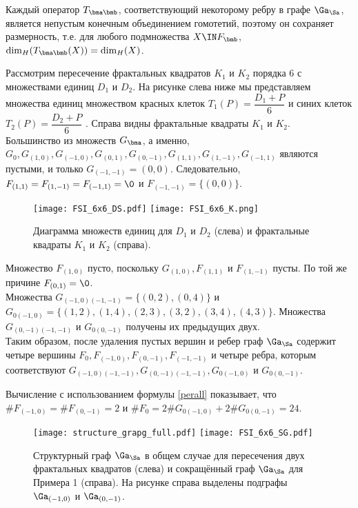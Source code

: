Каждый оператор $T_{\bma\bmb}$, соответствующий некоторому ребру в графе $\Ga_\Sa$, является непустым конечным объединением гомотетий, поэтому он сохраняет размерность, т.е. для любого подмножества $X\IN F_\bmb$, $\dim_H(T_{\bma\bmb}(X))=\dim_H(X)$.\\


\begin{example} 

Рассмотрим пересечение фрактальных квадратов $K_1$ и $K_2$ порядка $6$ с множествами единиц $D_1$ и $D_2$.
На рисунке слева ниже мы представляем множества единиц множеством красных клеток $T_1(P)=\dfrac{D_1+P}{6}$ и синих клеток $T_2(P)=\dfrac{D_2+P}{6}$ .
Справа видны фрактальные квадраты $K_1$ и $K_2$. \\

Большинство из множеств $G_\bma$, а именно, \\
$G_0,G_{(1,0)},G_{(-1,0)},G_{(0,1)},G_{(0,-1)},G_{(1,1)},G_{(1,-1)},G_{(-1,1)}$ являются пустыми, и только $G_{(-1,-1)}=(0,0)$. Следовательно, 
$F_{(1,1)}=F_{(1,-1)}=F_{(-1,1)}=\0$ и $F_{(-1,-1)}=\{(0,0)\}$.\\


\begin{figure}[H]
    \texttt{[image: FSI\_6x6\_DS.pdf]}
    \hfill
    \texttt{[image: FSI\_6x6\_K.png]}
    \caption{Диаграмма множеств единиц для $D_1$ и $D_2$ (слева) и фрактальные квадраты $K_1$ и $K_2$ (справа).}
\end{figure}


Множество $F_{(1,0)}$ пусто, поскольку $G_{(1,0)},F_{(1,1)}$ и $F_{(1,-1)}$ пусты. 
По той же причине $F_{(0,1)}=\0$. \\

Множества $G_{(-1,0)(-1,-1)}=\{(0,2),(0,4)\}$ и \\
$G_{0(-1,0)}=\{(1,2),(1,4),(2,3),(3,2),(3,4),(4,3)\}$.
Множества $G_{(0,-1)(-1,-1)}$ и $G_{0(0,-1)}$ получены их предыдущих двух.\\

Таким образом, после удаления пустых вершин и ребер
граф $\Ga_\Sa$ содержит четыре вершины  $F_0,F_{(-1,0)},F_{(0,-1)},F_{(-1,-1)}$ и четыре ребра, которым соответствуют $G_{(-1,0)(-1,-1)}, G_{(0,-1)(-1,-1)},G_{0(-1,0)}$ и $G_{0(0,-1)}$.

Вычисление с использованием формулы \eqref{perall} показывает, что
$\#F_{(-1,0)}=\#F_{(0,-1)}=2$ и $\#F_0=2 \#G_{0(-1,0)}+2\#G_{0(0,-1)}=24.$


\begin{figure}[H]
    \centering
    \texttt{[image: structure\_grapg\_full.pdf]}
    \hfill
    \texttt{[image: FSI\_6x6\_SG.pdf]}
    \caption{Структурный граф $\Ga_\Sa$ в общем случае для пересечения двух фрактальных квадратов (слева) и сокращённый граф $\Ga_\Sa$ для Примера 1 (справа). На рисунке справа выделены подграфы $\Ga_{(-1,0)}$ и $\Ga_{(0,-1)}$. }
\end{figure} 
\end{example} 

